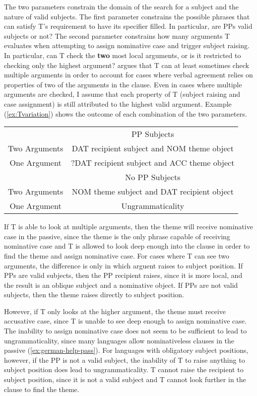The two parameters constrain the domain of the search for a subject and the nature of valid subjects. The first parameter constrains the possible phrases that can satisfy T's requirement to have its specifier filled. In particular, are PPs valid subjects or not? The second parameter constrains how many arguments T evaluates when attempting to assign nominative case and trigger subject raising. In particular, can T check the \textbf{two} most local arguments, or is it restricted to checking only the highest argument? \cite{Nevins.2011} argues that T can at least sometimes check multiple arguments in order to account for cases where verbal agreement relies on properties of two of the arguments in the clause. Even in cases where multiple arguments are checked, I assume that each property of T (subject raising and case assignment) is still attributed to the highest valid argument. Example (\ref{ex:Tvariation}) shows the outcome of each combination of the two parameters.

\begin{exe}
	\ex \label{ex:Tvariation}
	\begin{tabular}{cc}
		&	PP Subjects \\
Two Arguments	& DAT recipient subject and NOM theme object \\
One Argument    & ?DAT recipient subject and ACC theme object\\
\hline
	      & No PP Subjects \\
Two Arguments & NOM theme subject and DAT recipient object\\
One Argument  & Ungrammaticality\\
	\end{tabular}
\end{exe}

If T is able to look at multiple arguments, then the theme will receive nominative case in the passive, since the theme is the only phrase capable of receiving nominative case and T is allowed to look deep enough into the clause in order to find the theme and assign nominative case. For cases where T can see two arguments, the difference is only in which arguent raises to subject position. If PPs are valid subjects, then the PP recipient raises, since it is more local, and the result is an oblique subject and a nominative object. If PPs are not valid subjects, then the theme raises directly to subject position.

However, if T only looks at the higher argument, the theme must receive accusative case, since T is unable to see deep enough to assign nominative case. The inability to assign nominative case does not seem to be sufficient to lead to ungrammaticality, since many languages allow nominativeless clauses in the passive (\ref{ex:german-help-pass}). For languages with obligatory subject positions, however, if the PP is not a valid subject, the inability of T to raise anything to subject position does lead to ungrammaticality. T cannot raise the recipient to subject position, since it is not a valid subject and T cannot look further in the clause to find the theme.


